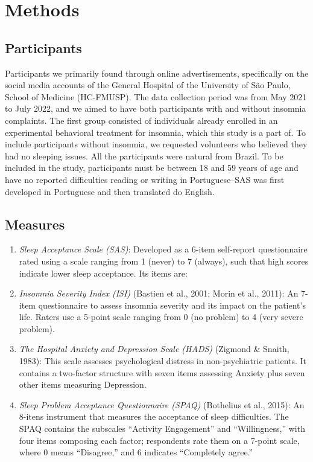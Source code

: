 \documentclass[
  letterpaper,
  DIV=11,
  numbers=noendperiod]{scrreprt}
\begin{document}
\hypertarget{methods}{%
\section{Methods}\label{methods}}

\hypertarget{participants}{%
\subsection{Participants}\label{participants}}

Participants we primarily found through online advertisements,
specifically on the social media accounts of the General Hospital of the
University of São Paulo, School of Medicine (HC-FMUSP). The data
collection period was from May 2021 to July 2022, and we aimed to have
both participants with and without insomnia complaints. The first group
consisted of individuals already enrolled in an experimental behavioral
treatment for insomnia, which this study is a part of. To include
participants without insomnia, we requested volunteers who believed they
had no sleeping issues. All the participants were natural from Brazil.
To be included in the study, participants must be between 18 and 59
years of age and have no reported difficulties reading or writing in
Portuguese--SAS was first developed in Portuguese and then translated do
English.

\hypertarget{measures}{%
\subsection{Measures}\label{measures}}

\begin{enumerate}
\def\labelenumi{\arabic{enumi}.}
\item
  \emph{Sleep Acceptance Scale (SAS)}: Developed as a 6-item self-report
  questionnaire rated using a scale ranging from 1 (never) to 7
  (always), such that high scores indicate lower sleep acceptance. Its
  items are:
\item
  \emph{Insomnia Severity Index (ISI)} (Bastien et al., 2001; Morin et
  al., 2011): An 7-item questionnaire to assess insomnia severity and
  its impact on the patient's life. Raters use a 5-point scale ranging
  from 0 (no problem) to 4 (very severe problem).
\item
  \emph{The Hospital Anxiety and Depression Scale (HADS)} (Zigmond \&
  Snaith, 1983): This scale assesses psychological distress in
  non-psychiatric patients. It contains a two-factor structure with
  seven items assessing Anxiety plus seven other items measuring
  Depression.
\item
  \emph{Sleep Problem Acceptance Questionnaire (SPAQ)} (Bothelius et
  al., 2015): An 8-itens instrument that measures the acceptance of
  sleep difficulties. The SPAQ contains the subscales ``Activity
  Engagement'' and ``Willingness,'' with four items composing each
  factor; respondents rate them on a 7-point scale, where 0 means
  ``Disagree,'' and 6 indicates ``Completely agree.''
\end{enumerate}
\end{document}

